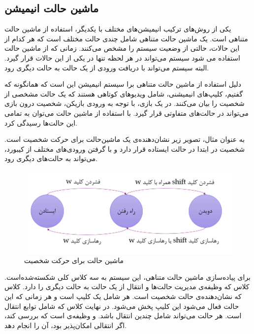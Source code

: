 \subsection{ماشین حالت انیمیشن}

یکی از روش‌های ترکیب انیمیشن‌های مختلف با یکدیگر، استفاده از ماشین حالت متناهی است.
یک ماشین‌ حالت متناهی شامل چندی حالت مختلف است
که هر کدام از این حالات، حالتی از وضعیت سیستم را مشخص می‌کنند.
زمانی که از ماشین حالت استفاده می شود سیستم می‌تواند در هر لحظه تنها در یکی از این حالات قرار گیرد.
البته سیستم می‌تواند با دریافت ورودی از یک حالت به حالت دیگری رود.

دلیل استفاده از ماشین حالت متناهی برا سیستم انیمیشن این است که همانگونه که گفتیم، کلیپ‌های انیمیشنی، شامل ویدیو‌های کوتاهی هستند که یک حالت مشخصی از شخصیت را بیان می‌کنند.
در یک بازی، با توجه به ورودی بازیکن، شخصیت درون بازی می‌تواند در حالت‌های متفاوتی قرار گیرد. با استفاده از ماشین حالت می‌توان به تمامی این حالت‌ها رسیدگی کرد.

به عنوان مثال، تصویر زیر نشان‌دهنده‌ی یک ماشین‌حالت برای حرکت شخصیت است. شخصیت در ابتدا در حالت ایستاده قرار دارد و با گرفتن
ورودی‌های مختلف از کیبورد، می‌تواند به حالت‌های دیگری رود.

\begin{figure}[ht]
	\centerline{\includegraphics[width=\textwidth,height=\textheight,keepaspectratio]{Figures/Ch5/LocomotionStateMachine.png}}

	\caption{ماشین حالت برای حرکت شخصیت}
	\label{fig:LocomotionStateMachine}
\end{figure}


برای پیا‌ده‌سازی ماشین حالت متناهی، این سیستم به سه کلاس کلی شکسته‌شده‌است. کلاس
که وظیفه‌ی مدیریت حالت‌ها و انتقال از یک حالت به حالت دیگری را دارد.
کلاس 
که نشان‌دهنده‌ی حالت شخصیت است. هر 
شامل یک کلیپ است و هر زمانی که این حالت فعال می‌شود این کلیپ پخش می‌شود.
 در نهایت کلاس
که شامل توابع انتقال است.
هر حالت می‌تواند شامل چندین انتقال باشد. و وظیفه‌ی
است که بررسی کند، اگر انتقالی امکان‌پذیر بود، آن را انجام دهد.

